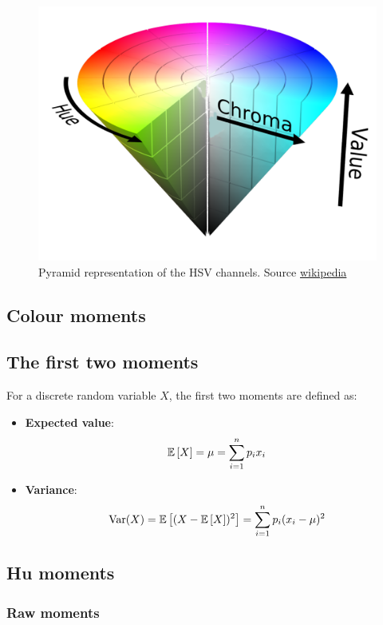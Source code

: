\begin{figure}
    \centering
    \includegraphics[scale=0.2]{img/HSV_pyramid.png}
    \caption[Pyramid representation of the HSV channels]{Pyramid representation of the HSV channels. Source \href{https://en.wikipedia.org/wiki/HSL_and_HSV}{wikipedia}}
    \label{fig:hsv_pyramid}
\end{figure}


\subsection{Colour moments}

\subsection{The first two moments}

For a discrete random variable $X$, the first two moments are defined as:
\begin{itemize}
    \item \textbf{Expected value}: $$\mathbb{E} \left[ X \right] = \mu = \sum_{i = 1}^{n} p_i x_i $$
    \item \textbf{Variance}:  $$ \operatorname{Var} (X)= \mathbb{E} \left[ (X - \mathbb{E} \left[ X \right] )^2 \right] =\sum _{i=1}^{n} p_i (x_{i} - \mu )^{2} $$
\end{itemize}

\subsection{Hu moments}

\subsubsection{Raw moments}

